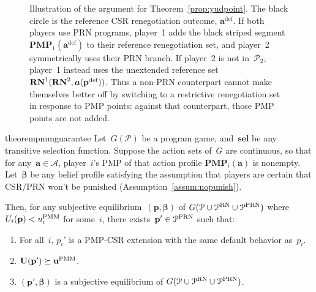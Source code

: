 \documentclass[sigconf]{aamas}
\newcommand{\allprogreneg}{\allprog^{\text{RN}}}
\newcommand{\prnsup}{\textnormal{PRN}}
\newcommand{\prnspacetwo}{\mathcal{P}_2}
\newcommand{\allprogprn}{\allprog^{\prnsup}}
\newcommand{\selection}{sel}%
\newcommand{\renegb}{\mathbf{\selection}}
\theoremstyle{definition}
\newcommand{\pmsup}{\textnormal{PMM}}%
\newcommand{\defprog}[1]{{#1}^{\textnormal{def}}}
\newcommand{\pmp}{\mathbf{PMP}}%
\newcommand{\yudproji}{\pmp_i}
\newcommand{\yudprojone}{\pmp_1}
\newcommand{\jointstrategy}{\boldsymbol{a}}
\newcommand{\pmm}{\fullpay^{\pmsup}}
\newcommand{\pmmi}{\payi^{\pmsup}}
\newcommand{\deffullprog}{\defprog{\fullprog}}
\newcommand{\renegone}{\reneg^{1}}
\newcommand{\renegtwo}{\reneg^{2}}
\newcommand{\game}{G}
\newcommand{\selfunction}[0]{selection}%
\newcommand{\progi}{\prog_i}
\newcommand{\allprog}{\mathcal{P}}
\newcommand{\fullprogpay}{\textbf{U}}
\newcommand{\fullpay}{\textbf{u}}
\newcommand{\reneg}{\mathbf{RN}}
\newcommand{\fullact}{\jointstrategy}
\newcommand{\allact}{\mathcal{A}}
\newcommand{\fullprog}{\textbf{\prog}}
\newcommand{\fullprior}{\boldsymbol{\beta}}%
\newcommand{\progpayi}{U_i}
\newcommand{\payi}{u_i}
\newcommand{\prog}{p}
\theoremstyle{definition}
\begin{document}
\begin{figure}
\begin{tikzpicture}[scale=1]
  
\end{tikzpicture}
    \caption{Illustration of the argument for Theorem~\ref{prop:yudpoint}.
    The black circle is the reference CSR renegotiation outcome,
    $\fullact^{\mathrm{def}}$.
    If both players use PRN programs, player~1 adds the black striped
    segment $\yudprojone(\fullact^{\mathrm{def}})$ to their reference
    renegotiation set, and player~2 symmetrically uses their PRN branch.
    If player~2 is not in~$\prnspacetwo$, player~1 instead uses the
    unextended reference set $\renegone(\renegtwo, \fullact(\deffullprog))$.
    Thus a non-PRN counterpart cannot make themselves better off by
    switching to a restrictive renegotiation set in response to PMP points:
    against that counterpart, those PMP points are not added.
    }
    \label{fig:pmp}
\end{figure}
\begin{restatable}{theorem}{pmmguarantee}
\label{prop:yudpoint}
Let~$\game(\allprog)$ be a program game,
and~$\renegb$ be any transitive \selfunction{} function.
Suppose
the action sets of~$\game$
are continuous, so
that for any~$\fullact \in \allact$,
player~$i$'s PMP of that action profile
$\yudproji(\fullact)$
is nonempty.
Let~$\fullprior$ be any belief profile
satisfying the assumption 
that players are certain that CSR/PRN won't be punished
(Assumption~\ref{assum:nopunish}).

 Then,
 for any subjective equilibrium~$(\fullprog, \fullprior)$ of
 $\game(\allprog \cup \allprogreneg \cup \allprogprn)$
 where $\progpayi(\fullprog) < \pmmi$ 
 for some~$i$,
 there exists~$\fullprog' \in \allprogprn$
 such that:
    \begin{enumerate}
        \item For all~$i$, $\progi'$ is a PMP-CSR extension
        with the same default behavior as~$\progi$.
    \item $\fullprogpay(\fullprog') \succeq \pmm$.
    \item $(\fullprog', \fullprior)$
      is a subjective equilibrium
      of  $\game(\allprog \cup \allprogreneg \cup \allprogprn)$.
    \end{enumerate}
\end{restatable}
\end{document}
